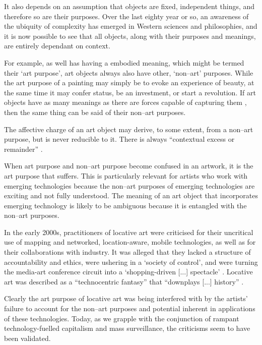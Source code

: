 \documentclass[letter:wpaper]{article}
\begin{document}
    It also depends on an assumption that objects are fixed, independent things, and therefore so are their purposes. Over the last eighty year or so, an awareness of the ubiquity of complexity has emerged in Western sciences and philosophies, and it is now possible to see that all objects, along with their purposes and meanings, are entirely dependant on context.

    For example, as well has having a embodied meaning, which might be termed their ‘art purpose’, art objects always also have other, ‘non–art’ purposes. While the art purpose of a painting may simply be to evoke an experience of beauty, at the same time it may confer status, be an investment, or start a revolution. If art objects have as many meanings as there are forces capable of capturing them \citep[p.4]{DeleuzeNtschAndPhlsphy2006}, then the same thing can be said of their non–art purposes.

    The affective charge of an art object may derive, to some extent, from a non–art purpose, but is never reducible to it. There is always ``contextual excess or remainder'' \citep[p.252]{MassumiPrblsFrThVrtl2002}.
    
    When art purpose and non–art purpose become confused in an artwork, it is the art purpose that suffers. This is particularly relevant for artists who work with emerging technologies because the non–art purposes of emerging technologies are exciting and not fully understood. The meaning of an art object that incorporates emerging technology is likely to be ambiguous because it is entangled with the non–art purposes.
    
	In the early 2000s, practitioners of locative art were criticised for their uncritical use of mapping and networked, location-aware, mobile technologies, as well as for their collaborations with industry. It was alleged that they lacked a structure of accountability and ethics, were ushering in a `society of control', and were turning the media-art conference circuit into a `shopping-driven [...] spectacle' \citep[p.358]{beyondLocativeMedia2006}. Locative art was described as a ``technocentric fantasy'' that ``downplays [...] history'' \citep[para. 2]{questioningTheFrame2004}.
    
    Clearly the art purpose of locative art was being interfered with by the artists' failure to account for the non–art purposes and potential inherent in applications of these technologies. Today, as we grapple with the conjunction of rampant technology-fuelled capitalism and mass surveillance, the criticisms seem to have been validated. 
\end{document}
